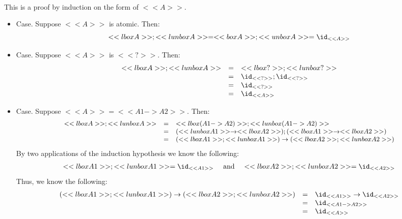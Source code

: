 \ \\
\noindent
This is a proof by induction on the form of $<<A>>$.

\begin{itemize}
\item[] Case. Suppose $<<A>>$ is atomic.  Then:
  \[
    <<lbox A>>;<<lunbox A>> = <<box A>>;<<unbox A>> = \id_{<<A>>}
    \]
    
  \item[] Case. Suppose $<<A>>$ is $<<?>>$.  Then:
    \[
    \begin{array}{lll}
      <<lbox A>>;<<lunbox A>> & = & <<lbox ?>>;<<lunbox ?>>\\
      & = & \id_{<<?>>};\id_{<<?>>}\\
      & = & \id_{<<?>>}\\
      & = & \id_{<<A>>}
    \end{array}
    \]

  \item[] Case. Suppose $<<A>> = <<A1 -> A2>>$.  Then:
    \[\small
    \begin{array}{lll}
      <<lbox A>>;<<lunbox A>>
      & = & <<lbox (A1 -> A2)>>;<<lunbox (A1 -> A2)>>\\
      & = & (<<lunbox A1>> \to <<lbox A2>>);(<<lbox A1>> \to <<lbox A2>>)\\
      & = & (<<lbox A1>>;<<lunbox A1>>) \to (<<lbox A2>>;<<lunbox A2>>)\\
    \end{array}
    \]
    By two applications of the induction hypothesis we know the
    following:
    \[
    \begin{array}{lll}
      <<lbox A1>>;<<lunbox A1>> = \id_{<<A1>>} & \text{ and } & <<lbox A2>>;<<lunbox A2>> = \id_{<<A2>>}
    \end{array}
    \]
    Thus, we know the following:
    \[
    \begin{array}{lll}
      (<<lbox A1>>;<<lunbox A1>>) \to (<<lbox A2>>;<<lunbox A2>>)
      & = & \id_{<<A1>>} \to \id_{<<A2>>}\\
      & = & \id_{<<A1 -> A2>>}\\
      & = & \id_{<<A>>}
    \end{array}
    \]


\end{itemize}
